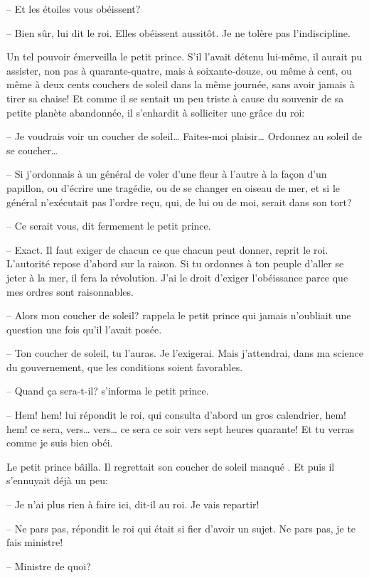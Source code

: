 \begin{Parallel}[p]{}{}
{-- Et les étoiles vous obéissent?

-- Bien sûr, lui dit le roi. Elles obéissent aussitôt. Je ne tolère pas l'indiscipline.

Un tel pouvoir émerveilla le petit prince. S'il l'avait détenu lui-même, il aurait pu assister, non pas à
quarante-quatre, mais à soixante-douze, ou même à
cent, ou même à deux cents couchers de soleil
dans la même journée, sans avoir jamais à tirer sa
chaise! Et comme il se sentait un peu triste à cause
du souvenir de sa petite planète abandonnée, il
s'enhardit à solliciter une grâce du roi:

-- Je voudrais voir un coucher de soleil\ldots{} Faites-moi plaisir\ldots{} Ordonnez au soleil de se coucher\ldots{}

-- Si j'ordonnais à un général de voler d'une fleur à l'autre à la façon d'un papillon, ou d'écrire une tragédie, ou de se changer en oiseau de mer, et
si le général n'exécutait pas l'ordre reçu, qui, de lui
ou de moi, serait dans son tort?

-- Ce serait vous, dit fermement le petit prince.

-- Exact. Il faut exiger de chacun ce que chacun
peut donner, reprit le roi. L'autorité repose d'abord
sur la raison. Si tu ordonnes à ton peuple d'aller se
jeter à la mer, il fera la révolution. J'ai le droit d'exiger
l'obéissance parce que mes ordres sont raisonnables.

-- Alors mon coucher de soleil? rappela le petit
prince qui jamais n'oubliait une question une fois
qu'il l'avait posée.

-- Ton coucher de soleil, tu l'auras. Je l'exigerai.
Mais j'attendrai, dans ma science du gouvernement,
que les conditions soient favorables.

-- Quand ça sera-t-il? s'informa le petit prince.

-- Hem! hem! lui répondit le roi, qui consulta
d'abord un gros calendrier, hem! hem! ce sera,
vers\ldots{} vers\ldots{} ce sera ce soir vers sept heures quarante! Et tu verras comme je suis bien obéi.

Le petit prince bâilla. Il regrettait son coucher de
soleil manqué . Et puis il s'ennuyait déjà un peu:

-- Je n'ai plus rien à faire ici, dit-il au roi. Je vais
repartir!

-- Ne pars pas, répondit le roi qui était si fier
d'avoir un sujet. Ne pars pas, je te fais ministre!

-- Ministre de quoi?

}
\end{Parallel}
